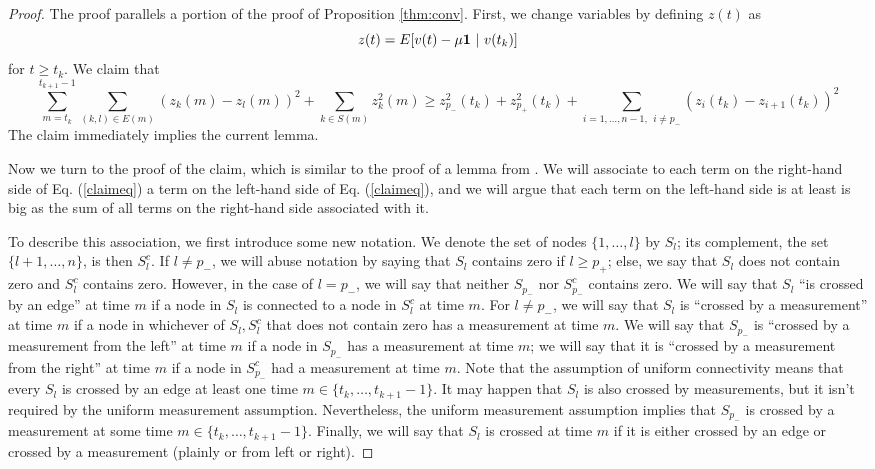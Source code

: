 \documentclass[final]{siamltex}
\begin{document}
 \begin{proof} {{{{{{The proof parallels a portion of the proof of {{{P}}roposition} \ref{thm:conv}. First, we change variables by defining $z(t)$ as \[ z(t) = E[ {{{v}}}(t) - \mu {{\bf 1}} ~|~ v(t_k)] \] for $t \geq t_k$.  We claim that  
\begin{equation} \label{claimeq} \sum_{m=t_k}^{t_{k+1}-1} \sum_{(k,l) \in E(m)} (z_k(m)-z_l(m))^2 +  \sum_{k \in S(m)} z_k^2(m)  \geq   z_{p_-}^2(t_k) + z_{p_+}^2(t_k) +  \sum_{i=1, \ldots, n-1, ~~ i \neq p_-} (z_i(t_k) - z_{i+1}(t_k))^2  \end{equation} The claim immediately implies the current lemma. }}} }}}
 
{{{Now we turn to the proof of the claim, {{{which is similar to the proof of a lemma from \cite{noot09}.}}} We will associate to each term on the right-hand side of
Eq. (\ref{claimeq}) a term on the left-hand side of Eq. (\ref{claimeq}), and we will argue that each term on the left-hand side is at least is big as the sum of
all terms on the right-hand side associated with it.  }}}

{{{To describe this association, we first introduce some new notation. We denote the set of nodes $\{1, \ldots, l\}$ by $S_l$; its complement, the set $\{l+1, \ldots, n\}$, is then $S_l^c$.  If $l \neq p_-$, we will abuse notation by saying that $S_l$ contains zero if $l \geq p_+$; else, we say that $S_l$ does not contain zero and $S_l^c$ contains zero. However, in the case of $l=p_-$, we will say that neither $S_{p_-}$ nor $S_{p_-}^c$ contains zero. We will say that $S_l$ ``is crossed by an edge''  at time $m$ if a node in $S_l$ is connected to a node in $S_l^c$ at time $m$. For $l \neq p_-$, we will say that $S_l$ is ``crossed by a measurement'' at time $m$ if a node in whichever of $S_l,S_l^c$ that does not contain zero has a measurement at time $m$. We will say that $S_{p_-}$ is ``crossed by a measurement from the left'' at time $m$ if a node in $S_{p_-}$  has a measurement at time $m$; we will say that it is ``crossed by a measurement from the right'' at time $m$ if a node in $S_{p_-}^c$ had a measurement at time $m$. Note that the assumption of uniform connectivity means that every $S_l$ is crossed by an edge at least one time $m \in \{ t_k, \ldots, t_{k+1}-1\}$. It may happen that $S_l$ is also crossed by measurements, but it isn't required by the uniform measurement assumption. Nevertheless, the uniform measurement assumption implies that $S_{p_-}$ is crossed by a measurement at some time $m \in \{ t_k, \ldots, t_{k+1}-1\}$. Finally, we will say that $S_l$ is crossed at time $m$ if it is either crossed by an edge or crossed by a measurement (plainly or from left or right).}}} 


\end{proof}
\end{document}
